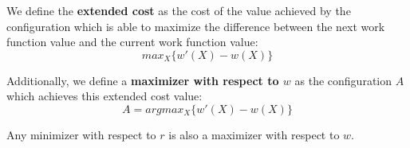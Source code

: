 \begin{definition}
    We define the \textbf{extended cost} as the cost of the value achieved by the configuration which is able to maximize the difference between the next work function value and the current work function value:
    \begin{equation*}
        max_X \{ w'(X) - w(X)\}
    \end{equation*}
\end{definition}

\begin{definition}
    Additionally, we define a \textbf{maximizer with respect to $w$} as the configuration $A$ which achieves this extended cost value:
    \begin{equation*}
        A = argmax_X \{ w'(X) - w(X) \}
    \end{equation*}
\end{definition}

\begin{lemma}
    \label{lem:dual}
    Any minimizer with respect to $r$ is also a maximizer with respect to $w$.
\end{lemma}

